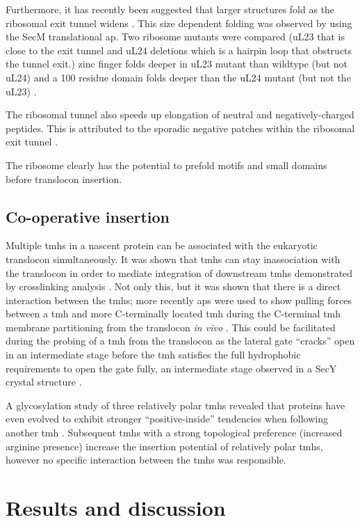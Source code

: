 Furthermore, it has recently been suggested that larger structures fold as the ribosomal exit tunnel widens \cite{Kudva2018}.
This size dependent folding was observed by using the SecM translational \gls{ap}.
Two ribosome mutants were compared (uL23 that is close to the exit tunnel and uL24 deletions which is a hairpin loop that obstructs the tunnel exit.) zinc finger folds deeper in uL23 mutant than wildtype (but not uL24) and a 100 residue domain folds deeper than the uL24 mutant (but not the uL23) \cite{Kudva2018}.

The ribosomal tunnel also speeds up elongation of neutral and negatively-charged peptides.
This is attributed to the sporadic negative patches within the ribosomal exit tunnel \cite{Lu2008}.

The ribosome clearly has the potential to prefold motifs and small domains before translocon insertion.

\subsection{Co-operative insertion}
Multiple \gls{tmh}s in a nascent protein can be associated with the eukaryotic translocon simultaneously.
It was shown that \gls{tmh}s can stay inassociation with the translocon in order to mediate integration of downstream \gls{tmh}s demonstrated by crosslinking analysis \cite{Sadlish2005, Cross2009}.
Not only this, but it was shown that there is a direct interaction between the \gls{tmh}s; more recently \gls{ap}s were used to show pulling forces between a \gls{tmh} and more C-terminally located \gls{tmh} during the C-terminal \gls{tmh} membrane partitioning from the translocon \textit{in vivo} \cite{Cymer2013}.
This could be facilitated during the probing of a \gls{tmh} from the translocon as the lateral gate ``cracks'' open in an intermediate stage before the \gls{tmh} satisfies the full hydrophobic requirements to open the gate fully, an intermediate stage observed in a SecY crystal structure \cite{Egea2010}.

A glycosylation study of three relatively polar \gls{tmh}s revealed that proteins have even evolved to exhibit stronger ``positive\--inside'' tendencies when following another \gls{tmh} \cite{Virkki2014}.
Subsequent \gls{tmh}s with a strong topological preference (increased arginine presence) increase the insertion potential of relatively polar \gls{tmh}s, however no specific interaction between the \gls{tmh}s was responsible.

\section{Results and discussion}


